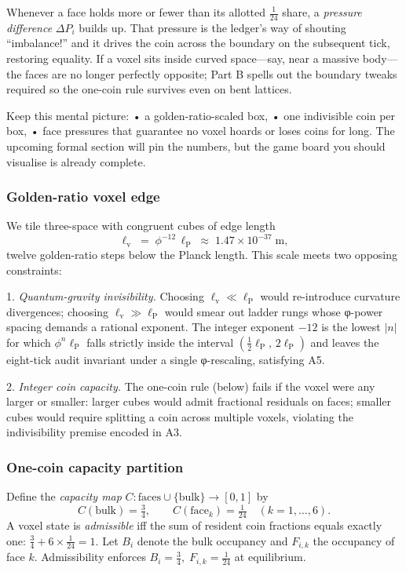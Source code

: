 \documentclass[11pt,oneside]{book}
\begin{document}
Whenever a face holds more or fewer than its allotted \(\tfrac{1}{24}\) share,
a \emph{pressure difference} \(\Delta P_i\) builds up.  
That pressure is the ledger’s way of shouting “imbalance!” and it drives the
coin across the boundary on the subsequent tick, restoring equality.
If a voxel sits inside curved space—say, near a massive body—the faces are no
longer perfectly opposite; Part B spells out the boundary tweaks required so
the one-coin rule survives even on bent lattices.  

Keep this mental picture:  
• a golden-ratio-scaled box,  
• one indivisible coin per box,  
• face pressures that guarantee no voxel hoards or loses coins for long.  
The upcoming formal section will pin the numbers, but the game board you
should visualise is already complete.

\subsubsection{Golden-ratio voxel edge}
\label{subsubsec:voxel-edge}
We tile three-space with congruent cubes of edge length
\[
  \ell_{\mathrm{v}}
  \;=\;
  \phi^{-12}\,\ell_{\text{P}}
  \;\approx\;
  1.47\times10^{-37}\;\text{m},
\]
twelve golden-ratio steps below the Planck length.  
This scale meets two opposing constraints:

1. \emph{Quantum-gravity invisibility.}  
   Choosing $\ell_{\mathrm{v}}\ll\ell_{\text{P}}$ would re-introduce curvature
   divergences; choosing $\ell_{\mathrm{v}}\gg\ell_{\text{P}}$ would smear out
   ladder rungs whose φ-power spacing demands a rational exponent.  
   The integer exponent $-12$ is the lowest $|n|$ for which
   $\phi^{n}\ell_{\text{P}}$ falls strictly inside the interval
   $(\tfrac12\ell_{\text{P}},\,2\ell_{\text{P}})$ and leaves the eight-tick
   audit invariant under a single φ-rescaling, satisfying A5.

2. \emph{Integer coin capacity.}  
   The one-coin rule (below) fails if the voxel were any larger or smaller:
   larger cubes would admit fractional residuals on faces; smaller cubes would
   require splitting a coin across multiple voxels, violating the indivisibility
   premise encoded in A3.

\subsubsection{One-coin capacity partition}
\label{subsubsec:coin-partition}
Define the \emph{capacity map}
\(
  C : \text{faces} \cup \{\text{bulk}\} \to [0,1]
\)
by
\[
  C(\text{bulk})=\tfrac34,
  \qquad
  C(\text{face}_{k})=\tfrac1{24}
  \quad(k=1,\dots,6).
\]
A voxel state is \emph{admissible} iff the sum of resident coin fractions
equals exactly one:
\(
  \tfrac34 + 6\times\tfrac1{24} = 1.
\)
Let $B_i$ denote the bulk occupancy and $F_{i,k}$ the occupancy of face $k$.
Admissibility enforces
\(
  B_i=\tfrac34,
  \;
  F_{i,k}=\tfrac1{24}
\)
at equilibrium.
\end{document}
